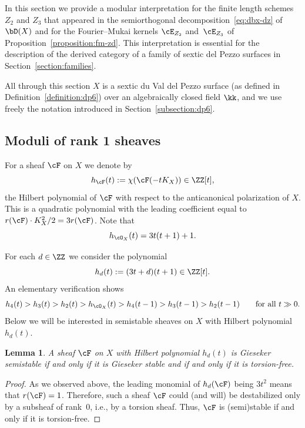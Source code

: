 \documentclass[11pt]{amsart}
\theoremstyle{plain}
\newtheorem{lemma}[theorem]{Lemma}
\theoremstyle{definition}
\theoremstyle{remark}
\begin{document}
In this section we provide a modular interpretation for the finite length schemes $Z_2$ and $Z_3$ that appeared in the semiorthogonal decomposition~\eqref{eq:dbx-dz} of $\bD(X)$
and for the Fourier--Mukai kernels $\cE_{Z_2}$ and~$\cE_{Z_3}$ of Proposition~\ref{proposition:fm-zd}.
This interpretation is essential for the description of the derived category of a family of sextic del Pezzo surfaces in Section~\ref{section:families}.

All through this section $X$ is a sextic du Val del Pezzo surface (as defined in Definition~\ref{definition:dp6}) over an algebraically closed field $\kk$, 
and we use freely the notation introduced in Section~\ref{subsection:dp6}.

\subsection{Moduli of rank 1 sheaves}\label{subsection:moduli}


For a sheaf $\cF$ on $X$ we denote by 
\begin{equation*}
h_\cF(t) := \chi(\cF(-tK_X)) \in \ZZ[t],
\end{equation*}
the Hilbert polynomial of $\cF$ with respect to the anticanonical polarization of $X$.
This is a quadratic polynomial with the leading coefficient equal to $r(\cF)\cdot K_X^2/2 = 3r(\cF)$.
Note that 
\begin{equation}\label{eq:hox}
h_{\cO_X}(t) = 3t(t+1) + 1.
\end{equation}

For each $d \in \ZZ$ we consider the polynomial
\begin{equation}\label{eq:hd}
h_d(t) := (3t + d)(t+1) 
\in \ZZ[t].
\end{equation}
An elementary verification shows
\begin{equation}\label{eq:hd-inequalities}
h_4(t) > h_3(t) > h_2(t) > h_{\cO_X}(t) > h_4(t-1) > h_3(t-1) > h_2(t-1)
\qquad\text{for all $t \gg 0$.}
\end{equation} 
Below we will be interested in semistable sheaves on $X$ with Hilbert polynomial $h_d(t)$.

\begin{lemma}
\label{lemma:hd-stable}
A sheaf $\cF$ on $X$ with Hilbert polynomial $h_d(t)$ is Gieseker semistable if and only if it is Gieseker stable and if and only if it is torsion-free.
\end{lemma}
\begin{proof}
As we observed above, the leading monomial of $h_d(\cF)$ being $3t^2$ means that $r(\cF) = 1$.
Therefore, such a sheaf $\cF$ could (and will) be destabilized only by a subsheaf of rank~0, i.e., by a torsion sheaf.
Thus, $\cF$ is (semi)stable if and only if it is torsion-free.
\end{proof}
\end{document}
